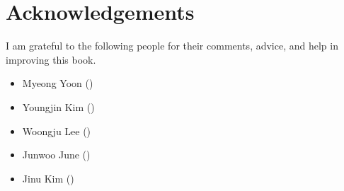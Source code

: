     \chapter*{Acknowledgements}

    I am grateful to the following people for their comments, advice, and help
    in improving this book.

    \begin{itemize}
        \item Myeong Yoon (\UniversityOfCambridge)
        \item Youngjin Kim (\YonseiUniversity)
        \item Woongju Lee (\MassachusettsInstituteOfTechnology)
        \item Junwoo June (\PohangUniversityOfScienceAndTechnology)
        \item Jinu Kim (\PohangUniversityOfScienceAndTechnology)
    \end{itemize}
